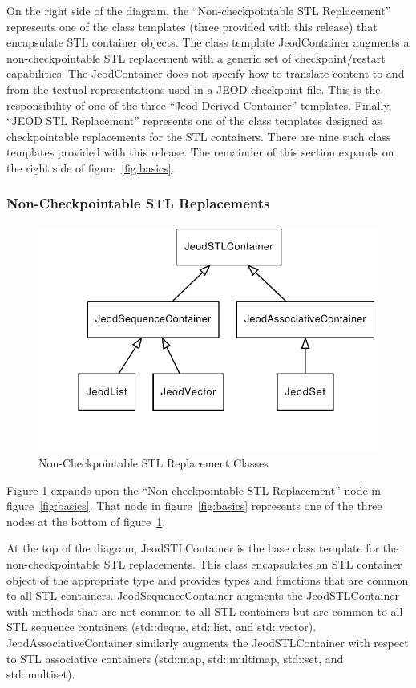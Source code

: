 On the right side of the diagram, the ``Non-checkpointable STL Replacement''
represents one of the class templates (three provided with this release)
that encapsulate STL container objects. The class template JeodContainer
augments a non-checkpointable STL replacement with a generic set of
checkpoint/restart capabilities.
The JeodContainer does not specify how to translate content to and from the
textual representations used in a JEOD checkpoint file.
This is the responsibility of one of the three ``Jeod Derived Container''
templates. Finally, ``JEOD STL Replacement'' represents one
of the class templates designed as checkpointable replacements for the STL
containers. There are nine such class templates provided with this release.
The remainder of this section expands on the right side of
figure~\ref{fig:basics}.

\subsubsection{Non-Checkpointable STL Replacements}
\begin{figure}[hbtp]
\centering
\includegraphics{stl_replacements_generic}
\caption{Non-Checkpointable STL Replacement Classes}
\label{fig:non_checkpointable_stl_replacements}
\end{figure}


Figure \ref{fig:non_checkpointable_stl_replacements} expands upon the
``Non-checkpointable STL Replacement'' node in figure~\ref{fig:basics}.
That node in figure~\ref{fig:basics} represents one of the three nodes at
the bottom of figure~\ref{fig:non_checkpointable_stl_replacements}.

At the top of the diagram, JeodSTLContainer is the base class template for
the non-checkpointable STL replacements. This class encapsulates an STL
container object of the appropriate type and provides types and functions that
are common to all STL containers.
JeodSequenceContainer augments the JeodSTLContainer with methods that are not
common to all STL containers but are common to all STL sequence containers
(std::deque, std::list, and std::vector). 
JeodAssociativeContainer similarly augments the JeodSTLContainer with respect
to STL associative containers (std::map, std::multimap, std::set, and
std::multiset).

